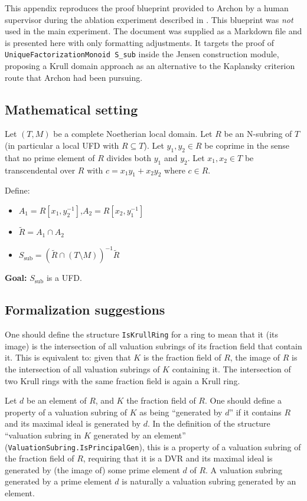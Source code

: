 \documentclass[]{pkuai4m}
\theoremstyle{plain}
\theoremstyle{definition}
\begin{document}
This appendix reproduces the proof blueprint provided to Archon by a human supervisor during the ablation experiment described in . This blueprint was \emph{not} used in the main experiment. The document was supplied as a Markdown file and is presented here with only formatting adjustments. It targets the proof of \texttt{UniqueFactorizationMonoid S\_sub} inside the Jensen construction module, proposing a Krull domain approach as an alternative to the Kaplansky criterion route that Archon had been pursuing.

\subsection*{Mathematical setting}

Let $(T, M)$ be a complete Noetherian local domain. Let $R$ be an N-subring of $T$ (in particular a local UFD with $R \subseteq T$). Let $y_1, y_2 \in R$ be coprime in the sense that no prime element of $R$ divides both $y_1$ and $y_2$. Let $x_1, x_2 \in T$ be transcendental over $R$ with $c = x_1 y_1 + x_2 y_2$ where $c \in R$.

Define:
\begin{itemize}
    \item $A_1 = R[x_1, y_2^{-1}]$,\quad $A_2 = R[x_2, y_1^{-1}]$
    \item $\tilde{R} = A_1 \cap A_2$
    \item $S_{\mathrm{sub}} = (\tilde{R} \cap (T \setminus M))^{-1}\tilde{R}$
\end{itemize}

\noindent\textbf{Goal:} $S_{\mathrm{sub}}$ is a UFD.

\subsection*{Formalization suggestions}

One should define the structure \texttt{IsKrullRing} for a ring to mean that it (its image) is the intersection of all valuation subrings of its fraction field that contain it. This is equivalent to: given that $K$ is the fraction field of $R$, the image of $R$ is the intersection of all valuation subrings of $K$ containing it. The intersection of two Krull rings with the same fraction field is again a Krull ring.

Let $d$ be an element of $R$, and $K$ the fraction field of $R$. One should define a property of a valuation subring of $K$ as being ``generated by $d$'' if it contains $R$ and its maximal ideal is generated by $d$. In the definition of the structure ``valuation subring in $K$ generated by an element'' (\texttt{ValuationSubring.IsPrincipalGen}), this is a property of a valuation subring of the fraction field of $R$, requiring that it is a DVR and its maximal ideal is generated by (the image of) some prime element $d$ of $R$. A valuation subring generated by a prime element $d$ is naturally a valuation subring generated by an element.
\end{document}
